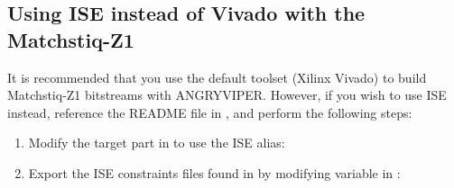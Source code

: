 \begin{appendices}
\section{Using ISE instead of Vivado with the Matchstiq-Z1}
It is recommended that you use the default toolset (Xilinx Vivado) to build Matchstiq-Z1 bitstreams with ANGRYVIPER. However, if you wish to use ISE instead, reference the README file in , and perform the following steps:
\begin{enumerate}
\item{Modify the target part in  to use the ISE alias:
\subitem {}}
\item{Export the ISE constraints files found in  by modifying  variable in :
\subitem {}}
\end{enumerate}

%

\end{appendices}

